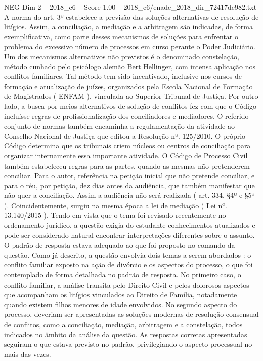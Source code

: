 \begin{textsample}{NEG Dim 2 – 2018\_c6 – Score 1.00 – 2018\_c6/enade\_2018\_dir\_72417de982.txt}
A norma do art. 3º estabelece a previsão das soluções alternativas de resolução de litígios.
Assim, a conciliação, a mediação e a arbitragem são indicadas, de forma exemplificativa, como parte desses mecanismos de soluções para enfrentar o problema do excessivo número de processos em curso perante o Poder Judiciário.
Um dos mecanismos alternativos não previstos é o denominado constelação, método cunhado pelo psicólogo alemão Bert Hellinger, com intensa aplicação nos conflitos familiares.
Tal método tem sido incentivado, inclusive nos cursos de formação e atualização de juízes, organizados pela Escola Nacional de Formação de Magistrados ( ENFAM ), vinculada ao Superior Tribunal de Justiça.
Por outro lado, a busca por meios alternativos de solução de conflitos fez com que o Código incluísse regras de profissionalização dos conciliadores e mediadores.
O referido conjunto de normas também encaminha a regulamentação da atividade ao Conselho Nacional de Justiça que editou a Resolução nº. 125/2010.
O próprio Código determina que os tribunais criem núcleos ou centros de conciliação para organizar internamente essa importante atividade.
O Código de Processo Civil também estabeleceu regras para as partes, quando as mesmas não pretenderem conciliar.
Para o autor, referência na petição inicial que não pretende conciliar, e para o réu, por petição, dez dias antes da audiência, que também manifestar que não quer a conciliação.
Assim a audiência não será realizada ( art. 334. §4º e §5º ).
Coincidentemente, surgiu na mesma época a lei de mediação ( Lei nº. 13.140/2015 ).
Tendo em vista que o tema foi revisado recentemente no ordenamento jurídico, a questão exigia do estudante conhecimentos atualizados e pode ser considerado natural encontrar interpretações diferentes sobre o assunto.
O padrão de resposta estava adequado ao que foi proposto no comando da questão.
Como já descrito, a questão envolvia dois temas a serem abordados : o conflito familiar exposto na ação de divórcio e os aspectos do processo, o que foi contemplado de forma detalhada no padrão de resposta.
No primeiro caso, o conflito familiar, a análise transita pelo Direito Civil e pelos dolorosos aspectos que acompanham os litígios vinculados ao Direito de Família, notadamente quando existem filhos menores de idade envolvidos.
No segundo aspecto do processo, deveriam ser apresentadas as soluções modernas de resolução consensual de conflitos, como a conciliação, mediação, arbitragem e a constelação, todos indicados no âmbito da análise da questão.
As respostas corretas apresentadas seguiram o que estava previsto no padrão, privilegiando o aspecto processual no mais das vezes.

\end{textsample}
